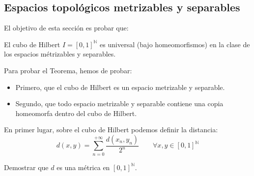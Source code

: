 \subsection{Espacios topológicos metrizables y separables}
El objetivo de esta sección es probar que:
\begin{teo}
    El cubo de Hilbert $I = {[0,1]}^{\mathbb{N}}$ es universal (bajo homeomorfismos) en la clase de los espacios métrizables y separables.
\end{teo}
Para probar el Teorema, hemos de probar:
\begin{itemize}
    \item Primero, que el cubo de Hilbert es un espacio metrizable y separable.
    \item Segundo, que todo espacio metrizable y separable contiene una copia homeomorfa dentro del cubo de Hilbert.
\end{itemize}
En primer lugar, sobre el cubo de Hilbert podemos definir la distancia:
\begin{equation*}
    d(x,y) = \sum_{n=0}^{+\infty} \dfrac{d(x_n,y_n)}{2^n} \qquad \forall x,y\in {[0,1]}^{\mathbb{N}}
\end{equation*}
\begin{ejercicio*}
    Demostrar que $d$ es una métrica en ${[0,1]}^{\mathbb{N}}$.
\end{ejercicio*}
